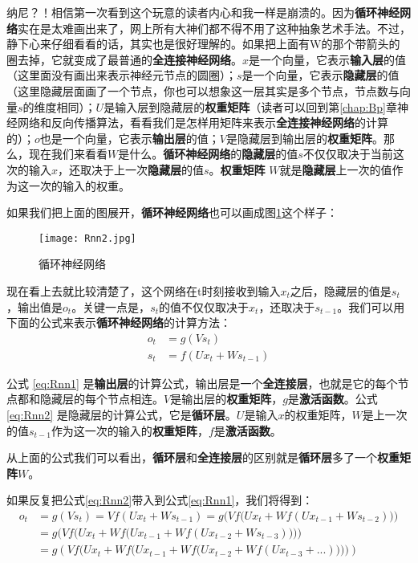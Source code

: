 纳尼？！相信第一次看到这个玩意的读者内心和我一样是崩溃的。因为\textbf{循环神经网络}实在是太难画出来了，网上所有大神们都不得不用了这种抽象艺术手法。不过，静下心来仔细看看的话，其实也是很好理解的。如果把上面有W的那个带箭头的圈去掉，它就变成了最普通的\textbf{全连接神经网络}。$x$是一个向量，它表示\textbf{输入层}的值（这里面没有画出来表示神经元节点的圆圈）；$s$是一个向量，它表示\textbf{隐藏层}的值（这里隐藏层面画了一个节点，你也可以想象这一层其实是多个节点，节点数与向量$s$的维度相同）；$U$是输入层到隐藏层的\textbf{权重矩阵}（读者可以回到第\ref{chap:Bp}章神经网络和反向传播算法，看看我们是怎样用矩阵来表示\textbf{全连接神经网络}的计算的）；$o$也是一个向量，它表示\textbf{输出层}的值；$V$是隐藏层到输出层的\textbf{权重矩阵}。那么，现在我们来看看$W$是什么。\textbf{循环神经网络}的\textbf{隐藏层}的值$s$不仅仅取决于当前这次的输入$x$，还取决于上一次\textbf{隐藏层}的值$s$。\textbf{权重矩阵}
$W$就是\textbf{隐藏层}上一次的值作为这一次的输入的权重。

如果我们把上面的图展开，\textbf{循环神经网络}也可以画成图\ref{fig:Rnn2}这个样子：

\begin{figure}[!h]
	\centering
	\texttt{[image: Rnn2.jpg]}
	\caption{循环神经网络}
	\label{fig:Rnn2}
\end{figure}

现在看上去就比较清楚了，这个网络在t时刻接收到输入\({x}_{t}\)之后，隐藏层的值是\({s}_{t}\)，输出值是\({o}_{t}\)。关键一点是，\({s}_t\)的值不仅仅取决于\({x}_t\)，还取决于\({s}_{t-1}\)。我们可以用下面的公式来表示\textbf{循环神经网络}的计算方法：
\begin{align}
	{o}_t & =g(V{s}_t)\label{eq:Rnn1}            \\
	{s}_t & =f(U{x}_t+W{s}_{t-1})\label{eq:Rnn2}
\end{align}


公式 \ref{eq:Rnn1} 是\textbf{输出层}的计算公式，输出层是一个\textbf{全连接层}，也就是它的每个节点都和隐藏层的每个节点相连。$V$是输出层的\textbf{权重矩阵}，$g$是\textbf{激活函数}。公式 \ref{eq:Rnn2} 是隐藏层的计算公式，它是\textbf{循环层}。$U$是输入$x$的权重矩阵，$W$是上一次的值\({s}_{t-1}\)作为这一次的输入的\textbf{权重矩阵}，$f$是\textbf{激活函数}。

从上面的公式我们可以看出，\textbf{循环层}和\textbf{全连接层}的区别就是\textbf{循环层}多了一个\textbf{权重矩阵}$W$。

如果反复把公式\ref{eq:Rnn2}带入到公式\ref{eq:Rnn1}，我们将得到：
\begin{align*}
	{o}_t & =g(V{s}_t)=Vf(U{x}_t+W{s}_{t-1})= g\Big(Vf\big(U{x}_t+Wf(U{x}_{t-1}+W{s}_{t-2})\big)\Big)             \\
	      & = g\Bigg(Vf\Big(U{x}_t+Wf\big(U{x}_{t-1}+Wf(U{x}_{t-2}+W{s}_{t-3})\big)\Big)\Bigg)                    \\
	      & = g\left(Vf\Bigg(U{x}_t+Wf\Big(U{x}_{t-1}+Wf\big(U{x}_{t-2}+Wf(U{x}_{t-3}+...)\big)\Big)\Bigg)\right)
\end{align*}


